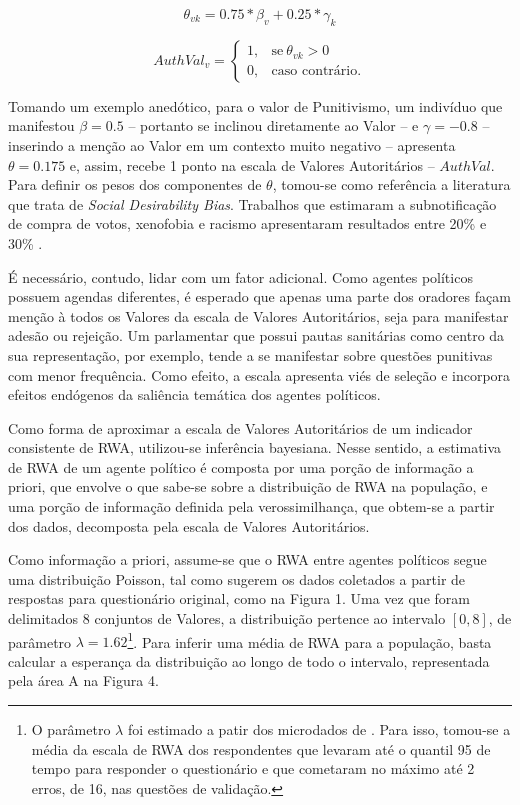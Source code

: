 \documentclass[
12pt,				%
openright,			%
twoside,			%
a4paper,			%
english,			%
french,				%
spanish,			%
brazil				%
]{abntex2}
\begin{document}
\begin{equation}
\theta_{vk} = 0.75 * \beta_v +  0.25 * \gamma_k
\end{equation}

\begin{equation}
AuthVal_v = 
\begin{cases}
1, & \text{se}\ \theta_{vk} > 0 \\
0, & \text{caso contrário.}
\end{cases}
\end{equation}

Tomando um exemplo anedótico, para o valor de Punitivismo, um indivíduo que manifestou $\beta = 0.5$ -- portanto se inclinou diretamente ao Valor -- e $\gamma = -0.8$ -- inserindo a menção ao Valor em um contexto muito negativo -- apresenta $\theta = 0.175$ e, assim, recebe 1 ponto na escala de Valores Autoritários -- $AuthVal$. Para definir os pesos dos componentes de $\theta$, tomou-se como referência a literatura que trata de \emph{Social Desirability Bias}. Trabalhos que estimaram a subnotificação de compra de votos, xenofobia e racismo apresentaram resultados entre 20{\%} e 30{\%} \cite{rudmin1999norwegian,heerwig2009education,gonzalez2012vote}.

É necessário, contudo, lidar com um fator adicional. Como agentes políticos possuem agendas diferentes, é esperado que apenas uma parte dos oradores façam menção à todos os Valores da escala de Valores Autoritários, seja para manifestar adesão ou rejeição. Um parlamentar que possui pautas sanitárias como centro da sua representação, por exemplo, tende a se manifestar sobre questões punitivas com menor frequência. Como efeito, a escala apresenta viés de seleção e incorpora efeitos endógenos da saliência temática dos agentes políticos.

Como forma de aproximar a escala de Valores Autoritários de um indicador consistente de RWA, utilizou-se inferência bayesiana. Nesse sentido, a estimativa de RWA de um agente político é composta por uma porção de informação a priori, que envolve o que sabe-se sobre a distribuição de RWA na população, e uma porção de informação definida pela verossimilhança, que obtem-se a partir dos dados, decomposta pela escala de Valores Autoritários. 

Como informação a priori, assume-se que o RWA entre agentes políticos segue uma distribuição Poisson, tal como sugerem os dados coletados a partir de respostas para questionário original, como na Figura 1. Uma vez que foram delimitados 8 conjuntos de Valores, a distribuição pertence ao intervalo $[0, 8]$, de parâmetro $\lambda = 1.62$\footnote{O parâmetro $\lambda$ foi estimado a patir dos microdados de . Para isso, tomou-se a média da escala de RWA dos respondentes que levaram até o quantil 95 de tempo para responder o questionário e que cometaram no máximo até 2 erros, de 16, nas questões de validação.}. Para inferir uma média de RWA para a população, basta calcular a esperança da distribuição ao longo de todo o intervalo, representada pela área A na Figura 4.
\end{document}
